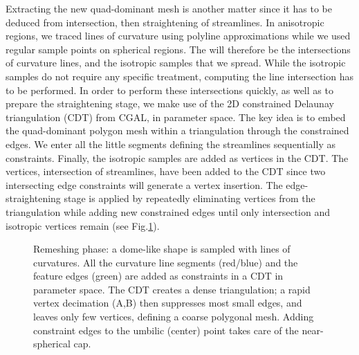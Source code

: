 Extracting the new quad-dominant mesh is another matter since it has
to be deduced from intersection, then straightening of streamlines.
In anisotropic regions, we traced lines of curvature using polyline
approximations while we used regular sample points on spherical
regions. The  will therefore be the intersections of
curvature lines, and the isotropic samples that we spread. While the
isotropic samples do not require any specific treatment, computing the
line intersection has to be performed.  In order to perform these
intersections quickly, as well as to prepare the straightening stage,
we make use of the 2D constrained Delaunay triangulation (CDT) from
CGAL, in parameter space. The key idea is to embed the quad-dominant
polygon mesh within a triangulation through the constrained edges. We
enter all the little segments defining the streamlines sequentially as
constraints.  Finally, the isotropic samples are added as vertices in
the CDT. The vertices, intersection of streamlines, have
 been added to the CDT since two intersecting
edge constraints will generate a vertex insertion. The
edge-straightening stage is applied by repeatedly eliminating vertices
from the triangulation while adding new constrained edges until only
intersection and isotropic vertices remain (see
Fig.\ref{fig:trimming}).

\begin{figure}
  \centering
  \caption{Remeshing phase: a dome-like shape is sampled with lines of
  curvatures. All the curvature line segments (red/blue) and the
  feature edges (green) are added as constraints in a CDT in parameter
  space. The CDT creates a dense triangulation; a rapid vertex
  decimation (A,B) then suppresses most small edges, and leaves only
  few vertices, defining a coarse polygonal mesh. Adding constraint
  edges to the umbilic (center) point takes care of the near-spherical
  cap.}
  \label{fig:trimming}
\end{figure}


